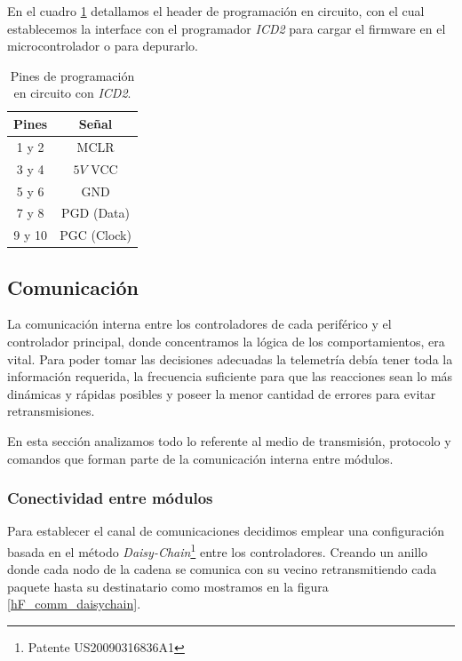 En el cuadro \ref{hT_header_icd2} detallamos el header de programaci\'on en circuito, con el cual establecemos la
interface con el programador \emph{ICD2} para cargar el firmware en el microcontrolador o para depurarlo.

\begin{table}
	\begin{center}
		\begin{tabular}{|c|c|}
			\hline
			Pines & Se\~nal \\
			\hline
			1 y 2 & MCLR \\
			\hline
			3 y 4 & $5V$ VCC \\
			\hline
			5 y 6 & GND \\
			\hline
			7 y 8 & PGD (Data) \\
			\hline
			9 y 10 & PGC (Clock) \\
			\hline
		\end{tabular}
		\caption{Pines de programaci\'on en circuito con \emph{ICD2}.}
		\label{hT_header_icd2}
	\end{center}
\end{table}


\subsection{Comunicaci\'on}
\label{h_comm}

La comunicaci\'on interna entre los controladores de cada perif\'erico y el controlador principal, donde concentramos
la l\'ogica de los comportamientos, era vital.
Para poder tomar las decisiones adecuadas la telemetr\'ia deb\'ia tener toda la informaci\'on requerida, la frecuencia
suficiente para que las reacciones sean lo m\'as din\'amicas y r\'apidas posibles y poseer la menor cantidad de errores
para evitar retransmisiones.

En esta secci\'on analizamos todo lo referente al medio de transmisi\'on, protocolo y comandos que forman parte de la
comunicaci\'on interna entre m\'odulos.

\subsubsection{Conectividad entre m\'odulos}
\label{h_comm_conectividad}

Para establecer el canal de comunicaciones decidimos emplear una configuraci\'on basada en el m\'etodo
\emph{Daisy-Chain}\footnote{Patente US20090316836A1} entre los controladores.
Creando un anillo donde cada nodo de la cadena se comunica con su vecino retransmitiendo cada paquete
hasta su destinatario como mostramos en la figura \ref{hF_comm_daisychain}.

